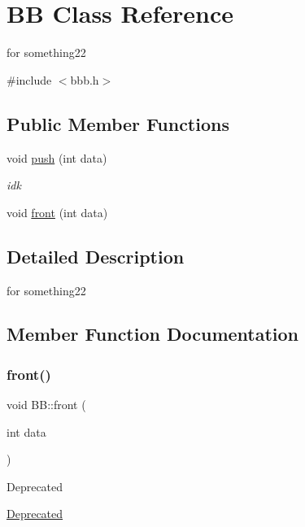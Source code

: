 \hypertarget{classBB}{}\section{BB Class Reference}
\label{classBB}


for something22  




{\ttfamily \#include $<$bbb.\+h$>$}

\subsection*{Public Member Functions}
\begin{DoxyCompactItemize}
\item 
void \hyperlink{classBB_a7e8f436769f43baf81ac99a80f510c32}{push} (int data)
\begin{DoxyCompactList}\small\item\em idk \end{DoxyCompactList}\item 
void \hyperlink{classBB_a2210986c70bfb6020abe71da38d42945}{front} (int data)
\end{DoxyCompactItemize}


\subsection{Detailed Description}
for something22 



\subsection{Member Function Documentation}
\mbox{\label{classBB_a2210986c70bfb6020abe71da38d42945}} 
\subsubsection{\texorpdfstring{front()}{front()}}
{\footnotesize\ttfamily void B\+B\+::front (\begin{DoxyParamCaption}\item[{int}]{data }\end{DoxyParamCaption})}

\begin{DoxyRefDesc}{Deprecated}
\item[\hyperlink{deprecated__deprecated000004}{Deprecated}]\end{DoxyRefDesc}


